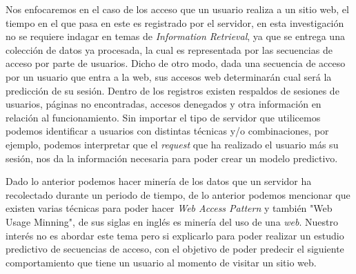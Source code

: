 
Nos enfocaremos en el caso de los acceso que un usuario realiza a un sitio web, el tiempo en el que pasa en este es registrado por el servidor, en esta investigación no se requiere indagar en temas de \emph{Information Retrieval}, ya que se entrega una colección de datos ya procesada, la cual es representada por las secuencias de acceso por parte de usuarios. 
Dicho de otro modo, dada una secuencia de acceso por un usuario que entra a la web, sus accesos web determinarán cual será la predicción de su sesión. Dentro de los registros existen respaldos de sesiones de usuarios, páginas no encontradas, accesos denegados y otra información en relación al funcionamiento. Sin importar el tipo de servidor que utilicemos podemos identificar a usuarios con distintas técnicas y/o combinaciones, por ejemplo, podemos interpretar que el \emph{request} que ha realizado el usuario más su sesión, nos da la información necesaria para poder crear un modelo predictivo. 

Dado lo anterior podemos hacer minería de los datos que un servidor ha recolectado durante un periodo de tiempo, de lo anterior  podemos mencionar que existen varias técnicas para poder hacer \emph{Web Access Pattern } y también  "Web Usage Minning", de sus siglas en inglés es minería del uso de una \emph{web}. Nuestro interés no es abordar este tema pero si explicarlo para poder realizar un estudio predictivo de secuencias de acceso, con el objetivo de poder predecir el siguiente comportamiento que tiene un usuario al momento de visitar un sitio web.







